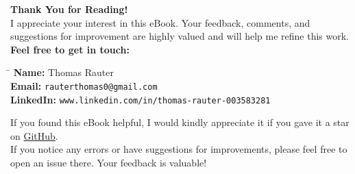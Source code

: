 \documentclass[12pt,openany, draft]{book}
\begin{document}
\begin{center}
    \vspace*{\fill}
    \Large{\textbf{Thank You for Reading!}}\\[1cm]
    \normalsize{
        I appreciate your interest in this eBook. Your feedback, comments, and suggestions for improvement are highly valued and will help me refine this work.
    }\\[0.5cm]
    \textbf{Feel free to get in touch:}\\[0.5cm]
    \begin{tabbing}
        \hspace{3cm} \= \hspace{6cm} \kill
        \textbf{Name:} \> Thomas Rauter \\
        \textbf{Email:} \> \texttt{rauterthomas0@gmail.com} \\
        \textbf{LinkedIn:} \> \texttt{www.linkedin.com/in/thomas-rauter-003583281} \\
    \end{tabbing}
    \normalsize{
        If you found this eBook helpful, I would kindly appreciate it if you gave it a star on \href{https://github.com/Thomas-Rauter/Navigating-Machine-Learning-Projects}{GitHub}.\\
        If you notice any errors or have suggestions for improvements, please feel free to open an issue there. Your feedback is valuable!
    }
    \\[1cm]
    \vspace*{\fill}
\end{center}
\end{document}
